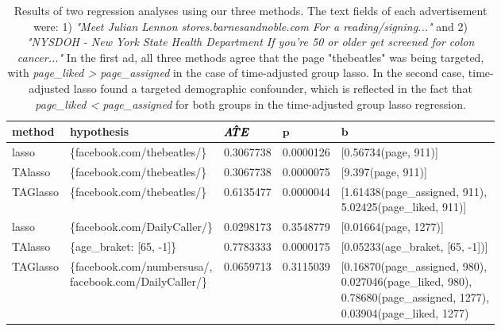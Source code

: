 \documentclass[]{article}
\begin{document}
\begin{table}
\begin{tabular}{|l|l|l|l|l|}
\hline
\textbf{method} & \textbf{hypothesis} & $\pmb{\Hat{ATE}}$ & $\pmb{p}$ & $\pmb{b}$ \\
\hline \hline
lasso & \{facebook.com/thebeatles/\} & 0.3067738 & 0.0000126 & [0.56734(page, 911)]\\
\hline
TAlasso & \{facebook.com/thebeatles/\} & 0.3067738 & 0.0000075 & [9.397(page, 911)]\\
\hline
TAGlasso & \{facebook.com/thebeatles/\} & 0.6135477 & 0.0000044 & \makecell[l]{[1.61438(page\_assigned, 911),\\ 5.02425(page\_liked, 911)]}\\
\hline
\hline
lasso & \{facebook.com/DailyCaller/\} & 0.0298173 & 0.3548779 & [0.01664(page, 1277)] \\
\hline
TAlasso &  \{age\_braket: [65, -1]\} & 0.7783333 & 0.0000175 & [0.05233(age\_braket, [65, -1])] \\
\hline
TAGlasso & \makecell[l]{\{facebook.com/numbersusa/, \\ facebook.com/DailyCaller/\}} & 0.0659713 & 0.3115039 & \makecell[l]{[0.16870(page\_assigned, 980), \\ 0.027046(page\_liked, 980), \\ 0.78680(page\_assigned, 1277), \\
0.03904(page\_liked, 1277)} \\
\hline
\end{tabular} 
\caption{Results of two regression analyses using our three methods. The text fields of each advertisement were: 1) \textit{"Meet Julian Lennon stores.barnesandnoble.com For a reading/signing..."} and 2) \textit{"NYSDOH - New York State Health Department If you're 50 or older get screened for colon cancer..."} In the first ad, all three methods agree that the page "thebeatles" was being targeted, with \textit{page\_liked > page\_assigned} in the case of time-adjusted group lasso. In the second case, time-adjusted lasso found a targeted demographic confounder, which is reflected in the fact that \textit{page\_liked < page\_assigned} for both groups in the time-adjusted group lasso regression.}
\end{table}

\label{tab:example}
\end{document}
